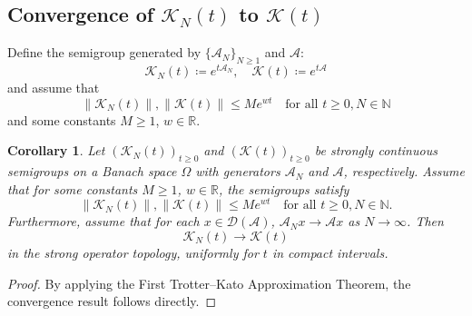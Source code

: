 \documentclass{article}[11]
\newtheorem{corollary}[theorem]{Corollary}
\begin{document}
\subsection{Convergence of \(\mathcal{K}_N(t)\) to \(\mathcal{K}(t)\)}

Define the semigroup generated by $\{\mathcal{A}_N\}_{N \geq 1}$ and $\mathcal{A}$:
$$
\mathcal{K}_N(t) \coloneqq e^{t\mathcal{A}_N}, \quad \mathcal{K}(t) \coloneqq e^{t\mathcal{A}}
$$
and assume that 
$$
\|\mathcal{K}_N(t)\|, \|\mathcal{K}(t)\| \leq Me^{wt} \quad \textrm{for all } t\geq0, N\in\mathbb{N}
$$
and some constants $M \geq 1$, $w \in \mathbb{R}$.

\begin{corollary}
	Let $(\mathcal{K}_N(t))_{t\geq0}$ and $(\mathcal{K}(t))_{t\geq0}$ be strongly continuous semigroups on a Banach space $\Omega$ with generators $\mathcal{A}_N$ and $\mathcal{A}$, respectively. Assume that for some constants $M \geq 1$, $w \in \mathbb{R}$, the semigroups satisfy
	\[
	\|\mathcal{K}_N(t)\|, \|\mathcal{K}(t)\| \leq Me^{wt} \quad \text{for all } t \geq 0, N \in \mathbb{N}.
	\]
	Furthermore, assume that for each $x \in \mathcal{D}(\mathcal{A})$, $\mathcal{A}_N x \to \mathcal{A} x$ as $N \to \infty$. Then 
	$$
	\mathcal{K}_N(t) \to \mathcal{K}(t)
	$$
	in the strong operator topology, uniformly for $t$ in compact intervals.
\end{corollary}
\begin{proof}
	By applying the First Trotter--Kato Approximation Theorem, the convergence result follows directly.
\end{proof}
	
	
\end{document}
